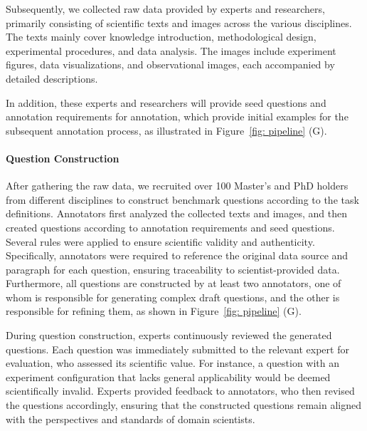 Subsequently, we collected raw data provided by experts and researchers, primarily consisting of scientific texts and images across the various disciplines. The texts mainly cover knowledge introduction, methodological design, experimental procedures, and data analysis. The images include experiment figures, data visualizations, and observational images, each accompanied by detailed descriptions.

In addition, these experts and researchers will provide seed questions and annotation requirements for annotation, which provide initial examples for the subsequent annotation process, as illustrated in Figure~\ref{fig: pipeline} (G).

\paragraph{Question Construction}  
After gathering the raw data, we recruited over 100 Master's and PhD holders from different disciplines to construct benchmark questions according to the task definitions. Annotators first analyzed the collected texts and images, and then created questions according to annotation requirements and seed questions. Several rules were applied to ensure scientific validity and authenticity. Specifically, annotators were required to reference the original data source and paragraph for each question, ensuring traceability to scientist-provided data. Furthermore, all questions are constructed by at least two annotators, one of whom is responsible for generating complex draft questions, and the other is responsible for refining them, as shown in Figure~\ref{fig: pipeline} (G).

During question construction, experts continuously reviewed the generated questions. Each question was immediately submitted to the relevant expert for evaluation, who assessed its scientific value. For instance, a question with an experiment configuration that lacks general applicability would be deemed scientifically invalid. Experts provided feedback to annotators, who then revised the questions accordingly, ensuring that the constructed questions remain aligned with the perspectives and standards of domain scientists.

